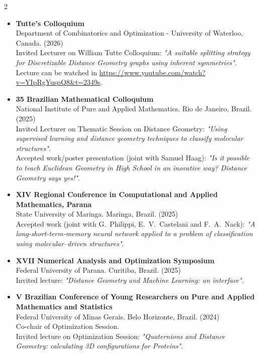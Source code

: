 \documentclass[10pt,A4,english]{article}
\begin{document}
\begin{paracol}{2}
\begin{rightcolumn}
\begin{itemize}[leftmargin=*]
\item \textbf{Tutte's Colloquium}
\medskip \\
Department of Combinatorics and Optimization - University of Waterloo, Canada. (2026)
\medskip \\
Invited Lecturer on William Tutte Colloquium: 
\textit{"A suitable splitting strategy for Discretizable Distance Geometry graphs using inherent symmetries"}.
\medskip \\
Lecture can be watched in \url{https://www.youtube.com/watch?v=YIpRgYuspQ8&t=2349s}.

\bigskip 

\item \textbf{35 Brazilian Mathematical Colloquium}
\medskip \\
National Institute of Pure and Applied Mathematics. 
Rio de Janeiro, Brazil. (2025)
\medskip \\
Invited Lecturer on Thematic Session on Distance Geometry: 
\textit{"Using supervised learning and distance geometry techniques to classify
molecular structures"}.
\medskip \\
Accepted work/poster presentation (joint with Samuel Haag): 
\textit{"Is it possible to teach Euclidean Geometry in High School
in an inovative way? Distance Geometry says yes!"}.

\bigskip 

\item \textbf{XIV Regional Conference in Computational and Applied Mathematics, Parana}
\medskip \\
State University of Maringa. 
Maringa, Brazil. (2025)
\medskip \\
Accepted work (joint with G.~Philippi, E.~V.~Castelani and F.~A.~Nack): 
\textit{"A long-short-term-memory neural network applied to a problem of
classification using molecular--driven structures"}.

\bigskip 

\item \textbf{XVII Numerical Analysis and Optimization Symposium}
\medskip \\
Federal University of Parana. 
Curitiba, Brazil. (2025)
\medskip \\
Invited lecture: 
\textit{"Distance Geometry and Machine Learning: an interface"}.

\bigskip 

\item \textbf{V Brazilian Conference of Young Researchers on Pure and Applied Mathematics and Statistics}
\medskip \\
Federal University of Minas Gerais. Belo Horizonte, Brazil. (2024)
\medskip \\
Co-chair of Optimization Session.
\medskip \\
Invited lecture on Optimization Session:
\textit{"Quaternions and Distance Geometry: calculating 3D configurations for Proteins"}.


\end{itemize}
\end{rightcolumn}
\end{paracol}
\end{document}

